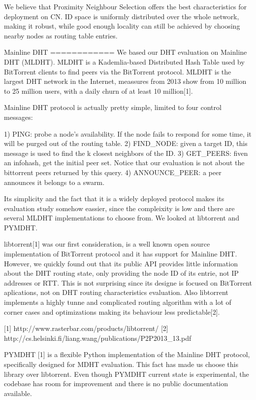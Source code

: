 We believe that Proximity Neighbour Selection offers the best characteristics for 
deployment on CN. ID space is uniformly distributed over the whole network, making 
it robust, while good enough locality can still be achieved by choosing nearby nodes  
as routing table entries.


Mainline DHT
============
We based our DHT evaluation on Mainline DHT (MLDHT). MLDHT is a Kademlia-based 
Distributed Hash Table used by BitTorrent clients to find peers via the BitTorrent 
protocol. MLDHT is the largest DHT network in the Internet, meassures from 2013 
show from 10 million to 25 million users, with a daily churn of at least 10 million[1].

Mainline DHT protocol is actually pretty simple, limited to four control messages:

1) PING: probe a node's availability. If the node fails to respond for some time, 
    it will be purged out of the routing table.
2) FIND_NODE: given a target ID, this message is used to find the {k} closest neighbors of the ID.
3) GET_PEERS: fiven an infohash, get the initial peer set. Notice that our evaluation 
    is not about the bittorrent peers returned by this query.
4) ANNOUNCE_PEER: a peer announces it belongs to a swarm.


Its simplicity and the fact that it is a widely deployed protocol makes its evaluation 
study somehow eassier, since the compleixity is low and there are several MLDHT 
implementations to choose from. We looked at libtorrent and PYMDHT.

libtorrent[1] was our first consideration, is a well known open source implementation 
of BitTorrent protocol and it has support for Mainline DHT. However, we quickly found out 
that its public API provides little information about the DHT routing state, only 
providing the node ID of its entrie, not IP addresses or RTT. This is not surprising since its designe is 
focused on BitTorrent aplications, not on DHT routing characteristics evaluation. 
Also libtorrent implements a highly tunne and complicated routing algorithm with a 
lot of corner cases and optimizations making its behaviour less predictable[2].

    [1] http://www.rasterbar.com/products/libtorrent/
    [2] http://cs.helsinki.fi/liang.wang/publications/P2P2013_13.pdf

PYMDHT [1] is a flexible Python implementation of the Mainline DHT protocol, 
specifically designed for MDHT evaluation. This fact has made us choose this 
library over libtorrent. Even though PYMDHT current state is experimental, 
the codebase has room for improvement and there is no public documentation available.

